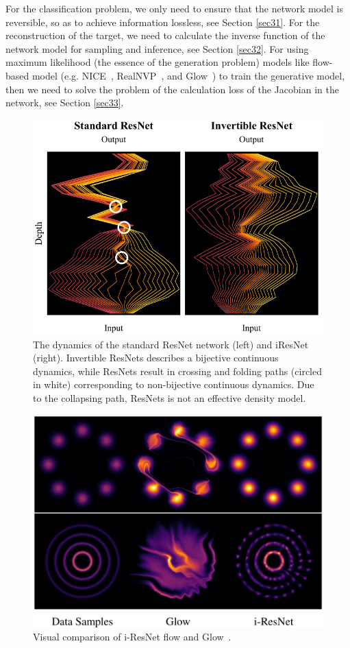 \documentclass[final]{cvpr}
\begin{document}
For the classification problem, we only need to ensure that the network model is reversible, so as to achieve information lossless, see Section \ref{sec31}. For the reconstruction of the target, we need to calculate the inverse function of the network model for sampling and inference, see Section \ref{sec32}. For using maximum likelihood (the essence of the generation problem) models like flow-based model (e.g. NICE~\cite{dinh2014nice}, RealNVP~\cite{dinh2016density}, and Glow~\cite{kingma2018glow}) to train the generative model, then we need to solve the problem of the calculation loss of the Jacobian in the network, see Section \ref{sec33}.

\begin{figure}[t]
   \begin{center}
      \includegraphics[width=1.0\linewidth]{1621241932669.png}
   \end{center}
      \caption{The dynamics of the standard ResNet network (left) and iResNet (right). Invertible ResNets describes a bijective continuous dynamics, while ResNets result in crossing and folding paths (circled in white) corresponding to non-bijective continuous dynamics. Due to the collapsing path, ResNets is not an effective density model.}
   \label{fig:1}
\end{figure}

\begin{figure}[t]
   \begin{center}
      \includegraphics[width=0.7\linewidth]{1621944333639.png}
   \end{center}
      \caption{Visual comparison of i-ResNet flow and Glow~\cite{kingma2018glow}.}
   \label{fig:2}
\end{figure}
\end{document}
